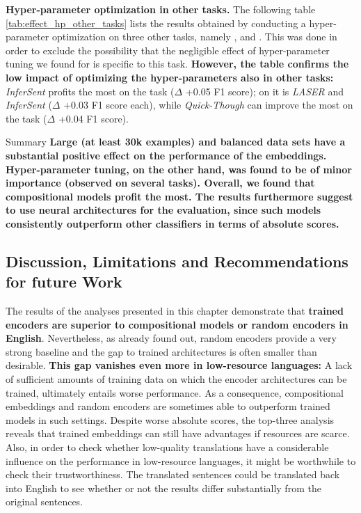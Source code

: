 \textbf{Hyper-parameter optimization in other tasks.} The following table \vref{tab:effect_hp_other_tasks} lists the results obtained by conducting a hyper-parameter optimization on three other tasks, namely ,  and . This was done in order to exclude the possibility that the negligible effect of hyper-parameter tuning we found for  is specific to this task. \textbf{However, the table confirms the low impact of optimizing the hyper-parameters also in other tasks:} \textit{InferSent} profits the most on the  task ($\Delta$ +0.05 F1 score); on  it is \textit{LASER} and \textit{InferSent} ($\Delta$ +0.03 F1 score each), while \textit{Quick-Though} can improve the most on the  task ($\Delta$ +0.04 F1 score).



\begin{tudbox}{Summary}
\textbf{Large (at least 30k examples) and balanced data sets have a substantial positive effect on the performance of the embeddings. Hyper-parameter tuning, on the other hand, was found to be of minor importance (observed on several tasks). Overall, we found that compositional models profit the most. The results furthermore suggest to use neural architectures for the evaluation, since such models consistently outperform other classifiers in terms of absolute scores.}
\end{tudbox}

\subsection{Discussion, Limitations and Recommendations for future Work}
\label{sec:discussion}

 The results of the analyses presented in this chapter demonstrate that \textbf{trained encoders are superior to compositional models or random encoders in English}. Nevertheless, as \citep{Wieting.2019} already found out, random encoders provide a very strong baseline and the gap to trained architectures is often smaller than desirable. \textbf{This gap vanishes even more in low-resource languages:} A lack of sufficient amounts of training data on which the encoder architectures can be trained, ultimately entails worse performance. As a consequence, compositional embeddings and random encoders are sometimes able to outperform trained models in such settings. Despite worse absolute scores, the top-three analysis reveals that trained embeddings can still have advantages if resources are scarce. Also, in order to check whether low-quality translations have a considerable  influence on the performance in low-resource languages, it might be worthwhile to check their trustworthiness. The translated sentences could be translated back into English to see whether or not the results differ substantially from the original sentences.

